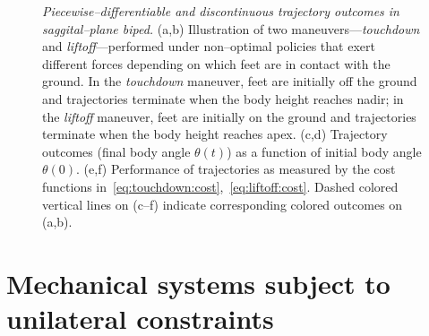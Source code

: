 \documentclass{article}
\begin{document}
\begin{figure}

\caption{\label{fig:mdls}
\emph{Piecewise--differentiable and discontinuous trajectory outcomes in saggital--plane biped.} 
(a,b) Illustration of two maneuvers---\emph{touchdown} and \emph{liftoff}---performed under non--optimal policies that exert different forces %
depending on which feet are in contact with the ground.
%
In the \emph{touchdown} maneuver, feet are initially off the ground and trajectories terminate when the body height reaches nadir;
in the \emph{liftoff} maneuver, feet are initially on the ground and trajectories terminate when the body height reaches apex.
(c,d) Trajectory outcomes (final body angle $\theta(t)$) as a function of initial body angle $\theta(0)$.
(e,f) Performance of trajectories as measured by the cost functions in~\eqref{eq:touchdown:cost},~\eqref{eq:liftoff:cost}.
Dashed colored vertical lines on (c--f) indicate corresponding colored outcomes on (a,b).
}
\end{figure}



\section{Mechanical systems subject to unilateral constraints}
\label{sec:sys}
\end{document}
